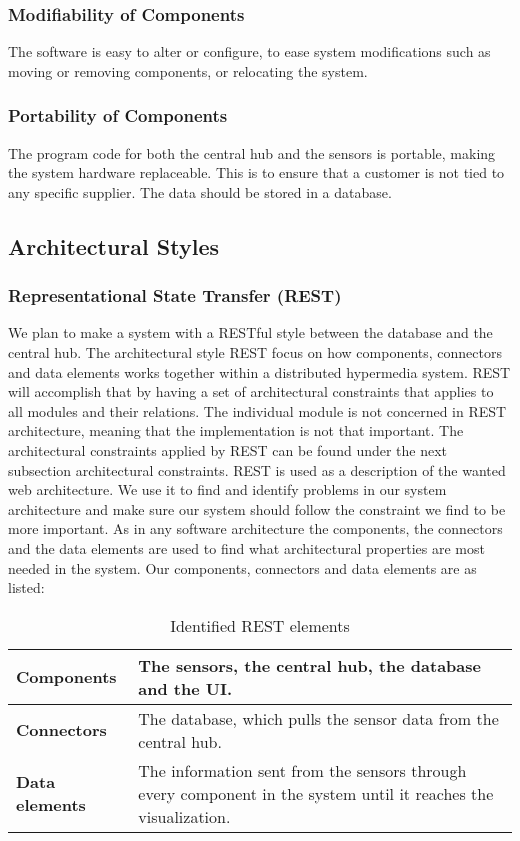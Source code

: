 \documentclass[../document.tex]{subfiles}
\begin{document}
\subsubsection{Modifiability of Components}
The software is easy to alter or configure, to ease system modifications such as moving or removing components, or relocating the system.

\subsubsection{Portability of Components}
The program code for both the central hub and the sensors is portable, making the system hardware replaceable. This is to ensure that a customer is not tied to any specific supplier. The data should be stored in a database.

\subsection{Architectural Styles}
\subsubsection{Representational State Transfer (REST)}
We plan to make a system with a RESTful style \cite{REST} between the database and the central hub. The architectural style \gls{REST} focus on how components, connectors and data elements works together within a distributed hypermedia system. \gls{REST} will accomplish that by having a set of architectural constraints that applies to all modules and their relations. The individual module is not concerned in \gls{REST} architecture, meaning that the implementation is not that important. The architectural constraints applied by \gls{REST} can be found under the next subsection architectural constraints. \gls{REST} is used as a description of the wanted web architecture. We use it to find and identify problems in our system architecture and make sure our system should follow the constraint we find to be more important. As in any software architecture the components, the connectors and the data elements are used to find what architectural properties are most needed in the system. Our components, connectors and data elements are as listed:

\begin{table}[H]
	\caption{Identified \gls{REST} elements}
	\begin{tabularx}{\textwidth}{|X|X|}
		\hline
		\textbf{Components}		& The sensors, the central hub, the database and the UI.  \\ \hline
		\textbf{Connectors}		& The database, which pulls the sensor data from the central hub.  \\ \hline
		\textbf{Data elements}	& The information sent from the sensors through every component in the system until it reaches  the visualization.  \\ \hline
	\end{tabularx}
\end{table}
\end{document}
